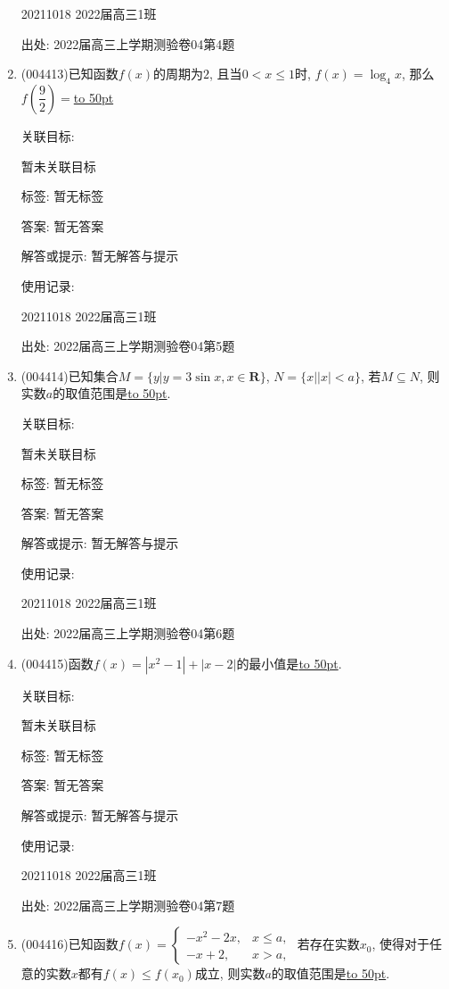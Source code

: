 \documentclass[10pt,a4paper]{article}
\newcommand{\blank}[1]{\underline{\hbox to #1pt{}}}
\begin{document}
\begin{enumerate}[1.]
20211018	2022届高三1班	


出处: 2022届高三上学期测验卷04第4题
\item { (004413)}已知函数$f(x)$的周期为$2$, 且当$0<x\le 1$时, $f(x)=\log_4x$, 那么$f(\dfrac 92)=$\blank{50}


关联目标:

暂未关联目标



标签: 暂无标签

答案: 暂无答案

解答或提示: 暂无解答与提示

使用记录:

20211018	2022届高三1班	


出处: 2022届高三上学期测验卷04第5题
\item { (004414)}已知集合$M=\{y|y=3\sin x,x\in \mathbf{R}\}$, $N=\{x||x|<a\}$, 若$M\subseteq N$, 则实数$a$的取值范围是\blank{50}.


关联目标:

暂未关联目标



标签: 暂无标签

答案: 暂无答案

解答或提示: 暂无解答与提示

使用记录:

20211018	2022届高三1班	


出处: 2022届高三上学期测验卷04第6题
\item { (004415)}函数$f(x)=|x^2-1|+|x-2|$的最小值是\blank{50}.


关联目标:

暂未关联目标



标签: 暂无标签

答案: 暂无答案

解答或提示: 暂无解答与提示

使用记录:

20211018	2022届高三1班	


出处: 2022届高三上学期测验卷04第7题
\item { (004416)}已知函数$f(x)=\begin{cases}  -x^2-2x, & x\le a,  \\-x+2, &x>a,  \end{cases}$ 若存在实数$x_0$, 使得对于任意的实数$x$都有$f(x)\le f(x_0)$成立, 则实数$a$的取值范围是\blank{50}.



\end{enumerate}
\end{document}
